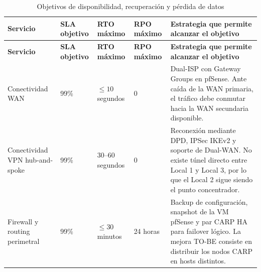 \documentclass[11pt, a4paper, oneside]{report}
\begin{document}
\begin{landscape}
\thispagestyle{fancy}

\renewcommand{\arraystretch}{1.3}
\footnotesize
{}

\begin{xltabular}{\linewidth}{@{}|L{3.7cm}|N{2.5cm}|N{2.7cm}|N{2.7cm}|X|@{}}
\caption{Objetivos de disponibilidad, recuperación y pérdida de datos}
\label{tab:sla_rto_rpo_servicios} \\

\parbox[c][1.1cm][c]{\linewidth}{\centering\color{white}\bfseries\small Servicio} &
\parbox[c][1.1cm][c]{\linewidth}{\centering\color{white}\bfseries\small SLA objetivo} &
\parbox[c][1.1cm][c]{\linewidth}{\centering\color{white}\bfseries\small RTO máximo} &
\parbox[c][1.1cm][c]{\linewidth}{\centering\color{white}\bfseries\small RPO máximo} &
\parbox[c][1.1cm][c]{\linewidth}{\centering\color{white}\bfseries\small Estrategia que permite alcanzar el objetivo} \\ \hline
\endfirsthead

\parbox[c][1.1cm][c]{\linewidth}{\centering\color{white}\bfseries\small Servicio} &
\parbox[c][1.1cm][c]{\linewidth}{\centering\color{white}\bfseries\small SLA objetivo} &
\parbox[c][1.1cm][c]{\linewidth}{\centering\color{white}\bfseries\small RTO máximo} &
\parbox[c][1.1cm][c]{\linewidth}{\centering\color{white}\bfseries\small RPO máximo} &
\parbox[c][1.1cm][c]{\linewidth}{\centering\color{white}\bfseries\small Estrategia que permite alcanzar el objetivo} \\ \hline
\endhead

\hline
\endfoot

{\small Conectividad WAN} &
{\small 99\%} &
{\small \(\leq 10\) segundos} &
{\small 0} &
{\small Dual-ISP con Gateway Groups en pfSense. Ante caída de la WAN primaria, el tráfico debe conmutar hacia la WAN secundaria disponible.} \\ \hline

{\small Conectividad VPN hub-and-spoke} &
{\small 99\%} &
{\small 30--60 segundos} &
{\small 0} &
{\small Reconexión mediante DPD, IPSec IKEv2 y soporte de Dual-WAN. No existe túnel directo entre Local 1 y Local 3, por lo que el Local 2 sigue siendo el punto concentrador.} \\ \hline

{\small Firewall y routing perimetral} &
{\small 99\%} &
{\small \(\leq 30\) minutos} &
{\small 24 horas} &
{\small Backup de configuración, snapshot de la VM pfSense y par CARP HA para failover lógico. La mejora TO-BE consiste en distribuir los nodos CARP en hosts distintos.} \\ \hline


\end{xltabular}
\end{landscape}
\end{document}
